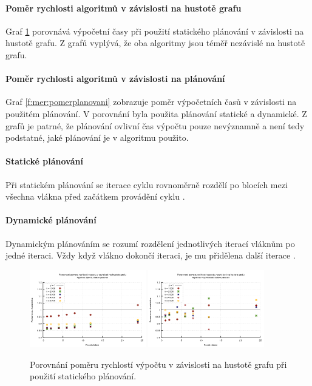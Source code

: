 \paragraph{Poměr rychlosti algoritmů v závislosti na hustotě grafu}
Graf \ref{f:mer:pomerhustota} porovnává výpočetní časy při použití statického plánování v závislosti na hustotě grafu. Z grafů vyplývá, že oba algoritmy jsou téměř nezávislé na hustotě grafu.

\paragraph{Poměr rychlosti algoritmů v závislosti na plánování}
Graf \ref{f:mer:pomerplanovani} zobrazuje poměr výpočetních časů v závislosti na použitém plánování. V porovnání byla použita plánování statické a dynamické. Z grafů je patrné, že plánování ovlivní čas výpočtu pouze nevýznamně a není tedy podstatné, jaké plánování je v algoritmu použito.
\paragraph{Statické plánování}
Při statickém plánování se iterace cyklu rovnoměrně rozdělí po blocích mezi všechna vlákna před začátkem provádění cyklu \cite{w:omp}.
\paragraph{Dynamické plánování}
Dynamickým plánováním se rozumí rozdělení jednotlivých iterací vláknům po jedné iteraci. Vždy když vlákno dokončí iteraci, je mu přidělena další iterace \cite{w:omp}.

\begin{figure}
    \centering
    \includegraphics[width=0.45\textwidth]{../grafy/02_openMP/02-04-Dijkstra_hustota_v1}
    \includegraphics[width=0.45\textwidth]{../grafy/02_openMP/02-04-Floyd_hustota_v1}
    \caption{Porovnání poměru rychlostí výpočtu v závislosti na hustotě grafu při použití statického plánování.}
    \label{f:mer:pomerhustota}
\end{figure}

